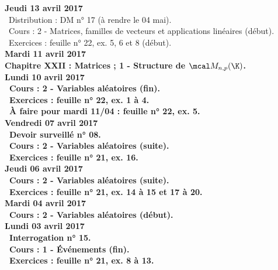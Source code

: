 \documentclass[12pt,a4paper]{article}
\begin{document}
\noindent\textbf{Jeudi 13 avril 2017}\\
\bu\ Distribution : DM n° 17 (à rendre le 04 mai).\\
\bu\ Cours : 2 - Matrices, familles de vecteurs et applications linéaires (début).\\
\bu\ Exercices : feuille n° 22, ex. 5, 6 et 8 (début).\vspace{.4cm}\\

\noindent\textbf{Mardi 11 avril 2017}\\
\bf Chapitre XXII \rm : Matrices ; 1 - Structure de $\mcal M_{n,p}(\K)$.\vspace{.4cm}\\
 
\noindent\textbf{\bf Lundi 10 avril 2017} \\
\bu\ Cours : 2 - Variables aléatoires (fin).\\
\bu\ Exercices : feuille n° 22, ex. 1 à 4.\\
\bu\ À faire pour mardi 11/04 : feuille n° 22, ex. 5.\vspace{.4cm}\\
 
\noindent\textbf{Vendredi 07 avril 2017}\\
\bu\ Devoir surveillé n° 08.\\
\bu\ Cours : 2 - Variables aléatoires (suite).\\
\bu\ Exercices : feuille n° 21, ex. 16.\vspace{.4cm}\\

\noindent\textbf{Jeudi 06 avril 2017}\\
\bu\ Cours : 2 - Variables aléatoires (suite).\\
\bu\ Exercices : feuille n° 21, ex. 14 à 15 et 17 à 20.\vspace{.4cm}\\

\noindent\textbf{Mardi 04 avril 2017}\\
\bu\ Cours : 2 - Variables aléatoires (début).\vspace{.4cm}\\
 
\noindent\textbf{\bf Lundi 03 avril 2017} \\
\bu\ Interrogation n° 15.\\
\bu\ Cours : 1 - Événements (fin).\\
\bu\ Exercices : feuille n° 21, ex. 8 à 13.\vspace{.4cm}\\
\end{document}

